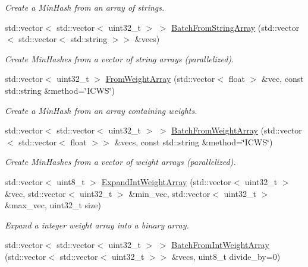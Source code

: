 \begin{DoxyCompactItemize}
\begin{DoxyCompactList}\small\item\em Create a Min\+Hash from an array of strings. \end{DoxyCompactList}\item 
std\+::vector$<$ std\+::vector$<$ uint32\+\_\+t $>$ $>$ \hyperlink{classtmap_1_1Minhash_a9382e443b9f622c4564449373051d006}{Batch\+From\+String\+Array} (std\+::vector$<$ std\+::vector$<$ std\+::string $>$$>$ \&vecs)
\begin{DoxyCompactList}\small\item\em Create Min\+Hashes from a vector of string arrays (parallelized). \end{DoxyCompactList}\item 
std\+::vector$<$ uint32\+\_\+t $>$ \hyperlink{classtmap_1_1Minhash_aac0a45bdf6a6517e711a171357c8c73b}{From\+Weight\+Array} (std\+::vector$<$ float $>$ \&vec, const std\+::string \&method=\char`\"{}I\+C\+WS\char`\"{})
\begin{DoxyCompactList}\small\item\em Create a Min\+Hash from an array containing weights. \end{DoxyCompactList}\item 
std\+::vector$<$ std\+::vector$<$ uint32\+\_\+t $>$ $>$ \hyperlink{classtmap_1_1Minhash_a8fe5c588003e8a3089d0a04df7b0f6e9}{Batch\+From\+Weight\+Array} (std\+::vector$<$ std\+::vector$<$ float $>$$>$ \&vecs, const std\+::string \&method=\char`\"{}I\+C\+WS\char`\"{})
\begin{DoxyCompactList}\small\item\em Create Min\+Hashes from a vector of weight arrays (parallelized). \end{DoxyCompactList}\item 
std\+::vector$<$ uint8\+\_\+t $>$ \hyperlink{classtmap_1_1Minhash_a5419c90e01785149b570f94308e82430}{Expand\+Int\+Weight\+Array} (std\+::vector$<$ uint32\+\_\+t $>$ \&vec, std\+::vector$<$ uint32\+\_\+t $>$ \&min\+\_\+vec, std\+::vector$<$ uint32\+\_\+t $>$ \&max\+\_\+vec, uint32\+\_\+t size)
\begin{DoxyCompactList}\small\item\em Expand a integer weight array into a binary array. \end{DoxyCompactList}\item 
std\+::vector$<$ std\+::vector$<$ uint32\+\_\+t $>$ $>$ \hyperlink{classtmap_1_1Minhash_a1f2ae587c6b9e98be1cbdc7e9a81c2e7}{Batch\+From\+Int\+Weight\+Array} (std\+::vector$<$ std\+::vector$<$ uint32\+\_\+t $>$$>$ \&vecs, uint8\+\_\+t divide\+\_\+by=0)
$$
\end{DoxyCompactItemize}

